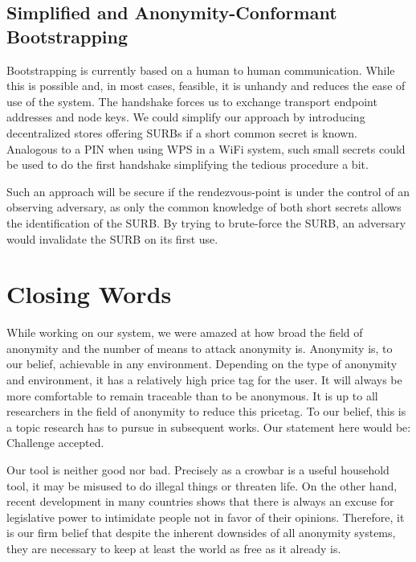 \section{Simplified and Anonymity-Conformant Bootstrapping}
Bootstrapping is currently based on a human to human communication. While this is possible and, in most cases, feasible, it is unhandy and reduces the ease of use of the system. The handshake forces us to exchange transport endpoint addresses and node keys. We could simplify our approach by introducing decentralized stores offering SURBs if a short common secret is known. Analogous to a PIN when using WPS in a WiFi system, such small secrets could be used to do the first handshake simplifying the tedious procedure a bit.

Such an approach will be secure if the rendezvous-point is under the control of an observing adversary, as only the common knowledge of both short secrets allows the identification of the SURB. By trying to brute-force the SURB, an adversary would invalidate the SURB on its first use.

\chapter{Closing Words}
While working on our system, we were amazed at how broad the field of anonymity and the number of means to attack anonymity is. Anonymity is, to our belief, achievable in any environment. Depending on the type of anonymity and environment, it has a relatively high price tag for the user. It will always be more comfortable to remain traceable than to be anonymous. It is up to all researchers in the field of anonymity to reduce this pricetag. To our belief, this is a topic research has to pursue in subsequent works. Our statement here would be: Challenge accepted.

Our tool is neither good nor bad. Precisely as a crowbar is a useful household tool, it may be misused to do illegal things or threaten life. On the other hand, recent development in many countries shows that there is always an excuse for legislative power to intimidate people not in favor of their opinions. Therefore, it is our firm belief that despite the inherent downsides of all anonymity systems, they are necessary to keep at least the world as free as it already is.